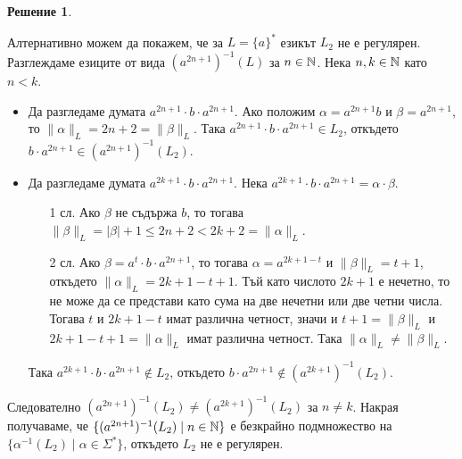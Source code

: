 \documentclass{article}
\theoremstyle{definition}
\newtheorem*{solution}{Решение}
\begin{document}
\begin{solution}
\begin{itemize}
              \pagebreak
              Алтернативно можем да покажем, че за $L = \{ a \}^*$ езикът $L_2$ не е регулярен.
              Разглеждаме езиците от вида $(a^{2n + 1})^{-1}(L)$ за $n \in \mathbb{N}$.
              Нека $n, k \in \mathbb{N}$ като $n < k$.
              \begin{itemize}
                  \item Да разгледаме думата $a^{2n + 1} \cdot b \cdot a^{2n + 1}$.
                        Ако положим $\alpha = a^{2n + 1} b$ и $\beta = a^{2n + 1}$, то $\|\alpha\|_L = 2n + 2 = \|\beta\|_L$.
                        Така $a^{2n + 1} \cdot b \cdot a^{2n + 1} \in L_2$, откъдето $b \cdot a^{2n + 1} \in (a^{2n + 1})^{-1}(L_2)$.
                  \item Да разгледаме думата $a^{2k + 1} \cdot b \cdot a^{2n + 1}$.
                        Нека $a^{2k + 1} \cdot b \cdot a^{2n + 1} = \alpha \cdot \beta$.
                        \begin{itemize}
                            \item[1 сл.] Ако $\beta$ не съдържа $b$, то тогава $\|\beta\|_L = |\beta| + 1 \leq 2n + 2 < 2k + 2 = \|\alpha\|_L$.
                            \item[2 сл.] Ако $\beta = a^t \cdot b \cdot a^{2n + 1}$, то тогава $\alpha = a^{2k + 1 - t}$ и $\|\beta\|_L = t + 1$, откъдето $\|\alpha\|_L= 2k + 1 - t + 1$.
                                  Тъй като числото $2k + 1$ е нечетно, то не може да се представи като сума на две нечетни или две четни числа.
                                  Тогава $t$ и $2k + 1 - t$ имат различна четност, значи и $t + 1 = \|\beta\|_L$ и $2k + 1 - t + 1 = \|\alpha\|_L$ имат различна четност.
                                  Така $\|\alpha\|_L \neq \|\beta\|_L$.
                        \end{itemize}
                        Така $a^{2k + 1} \cdot b \cdot a^{2n + 1} \notin L_2$, откъдето $b \cdot a^{2n + 1} \notin (a^{2k + 1})^{-1}(L_2)$.
              \end{itemize}
              Следователно $(a^{2n + 1})^{-1}(L_2) \neq (a^{2k + 1})^{-1}(L_2)$ за $n \neq k$.
              Накрая получаваме, че $\{ (a^{2n + 1})^{-1}(L_2) \mid n \in \mathbb{N} \}$ е безкрайно подмножество на $\{ \alpha^{-1}(L_2) \mid \alpha \in \Sigma^* \}$, откъдето $L_2$ не е регулярен.
    \end{itemize}
\end{solution}
\end{document}
